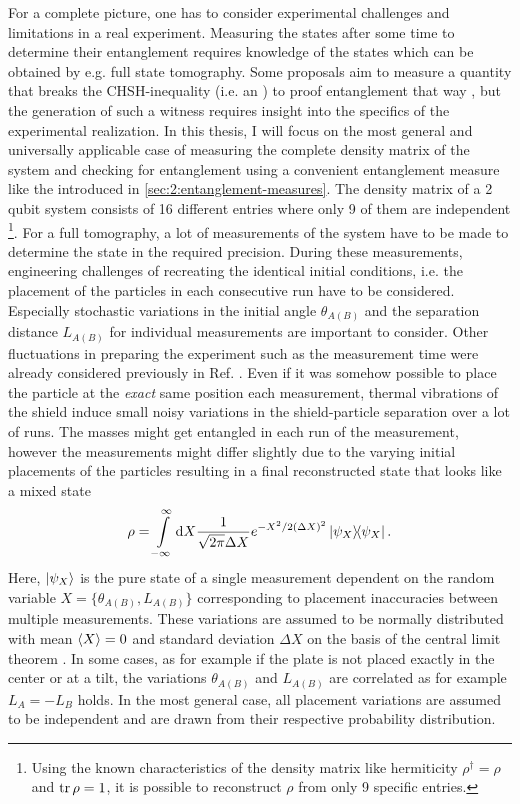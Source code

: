 For a complete picture, one has to consider experimental challenges and limitations in a real experiment. 
Measuring the states after some time to determine their entanglement requires knowledge of the states which can be obtained by e.g. full state tomography.
Some proposals aim to measure a quantity that breaks the CHSH-inequality \cite{Clauser_1969} (i.e. an ) to proof entanglement that way \cite{Bose_2017,Chevalier_2020}, but the generation of such a witness requires insight into the specifics of the experimental realization.
In this thesis, I will focus on the most general and universally applicable case of measuring the complete density matrix of the system and checking for entanglement using a convenient entanglement measure like the  \cite{Plenio_2005} introduced in \cref{sec:2:entanglement-measures}.
The density matrix of a 2 qubit system consists of 16 different entries where only 9 of them are independent \footnote{Using the known characteristics of the density matrix like hermiticity $\rho^\dagger = \rho$ and $\tr \rho = 1$, it is possible to reconstruct $\rho$ from only 9 specific entries.}.
For a full tomography, a lot of measurements of the system have to be made to determine the state in the required precision.
During these measurements, engineering challenges of recreating the identical initial conditions, i.e. the placement of the particles in each consecutive run have to be considered.
Especially stochastic variations in the initial angle $\theta_{A(B)}$ and the separation distance $L_{A(B)}$ for individual measurements are important to consider. Other fluctuations in preparing the experiment such as the measurement time were already considered previously in Ref. \cite{Nguyen_2020}.
Even if it was somehow possible to place the particle at the \textit{exact} same position each measurement, thermal vibrations of the shield induce small noisy variations in the shield-particle separation over a lot of runs.
The masses might get entangled in each run of the measurement, however the measurements might differ slightly due to the varying initial placements of the particles resulting in a final reconstructed state that looks like a mixed state
\begin{equation}
  \rho = \int\limits_{-\infty}^{\infty} \dd X \frac{1}{\sqrt{2\pi}\Delta X} e^{-X^2/2(\Delta X)^2} \ketbra{\psi_X} .
\end{equation}
Here, $\ket{\psi_X}$ is the pure state of a single measurement dependent on the random variable $X = \{\theta_{A(B)}, L_{A(B)}\}$ corresponding to placement inaccuracies between multiple measurements.
These variations are assumed to be normally distributed with mean $\left\langle X\right\rangle = 0$ and standard deviation $\Delta X$ on the basis of the central limit theorem \cite[p. 1195]{Riley_2018}.
In some cases, as for example if the plate is not placed exactly in the center or at a tilt, the variations $\theta_{A(B)}$ and $L_{A(B)}$ are correlated as for example $L_A = -L_B$ holds.
In the most general case, all placement variations are assumed to be independent and are drawn from their respective probability distribution.



